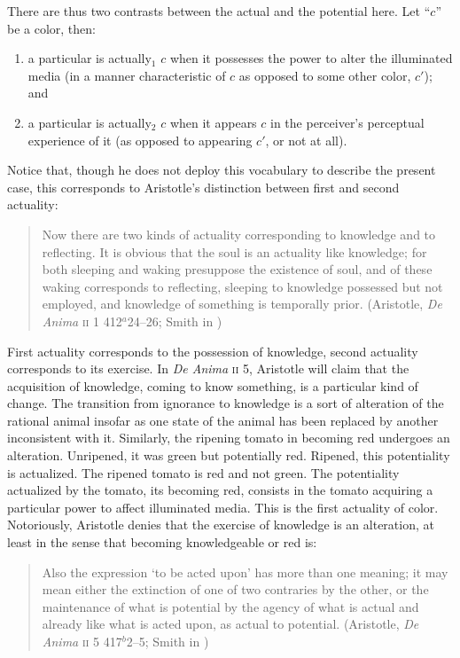 There are thus two contrasts between the actual and the potential here. Let ``\( c \)'' be a color, then:
\begin{enumerate}[(1)]
	\item a particular is actually\( _{1} \) \( c \) when it possesses the power to alter the illuminated media (in a manner characteristic of \( c \) as opposed to some other color, \( c' \)); and
	\item a particular is actually\( _{2} \) \( c \) when it appears \( c \) in the perceiver's perceptual experience of it (as opposed to appearing \( c' \), or not at all).
\end{enumerate}

Notice that, though he does not deploy this vocabulary to describe the present case, this corresponds to Aristotle's distinction between first and second actuality:
\begin{quote}
	Now there are two kinds of actuality corresponding to knowledge and to reflecting. It is obvious that the soul is an actuality like knowledge; for both sleeping and waking presuppose the existence of soul, and of these waking corresponds to reflecting, sleeping to knowledge possessed but not employed, and knowledge of something is temporally prior. (Aristotle, \emph{De Anima} \textsc{ii} 1 412\( ^{a} \)24--26; Smith in \citealt[21]{Barnes:1984uq})
\end{quote}
First actuality corresponds to the possession of knowledge, second actuality corresponds to its exercise. In \emph{De Anima} \textsc{ii} 5, Aristotle will claim that the acquisition of knowledge, coming to know something, is a particular kind of change. The transition from ignorance to knowledge is a sort of alteration of the rational animal insofar as one state of the animal has been replaced by another inconsistent with it. Similarly, the ripening tomato in becoming red undergoes an alteration. Unripened, it was green but potentially red. Ripened, this potentiality is actualized. The ripened tomato is red and not green. The potentiality actualized by the tomato, its becoming red, consists in the tomato acquiring a particular power to affect illuminated media. This is the first actuality of color. Notoriously, Aristotle denies that the exercise of knowledge is an alteration, at least in the sense that becoming knowledgeable or red is:
\begin{quote}
	 Also the expression ‘to be acted upon’ has more than one meaning; it may mean either the extinction of one of two contraries by the other, or the maintenance of what is potential by the agency of what is actual and already like what is acted upon, as actual to potential. (Aristotle, \emph{De Anima} \textsc{ii} 5 417\( ^{b} \)2--5; Smith in \citealt[30]{Barnes:1984uq})
\end{quote}
